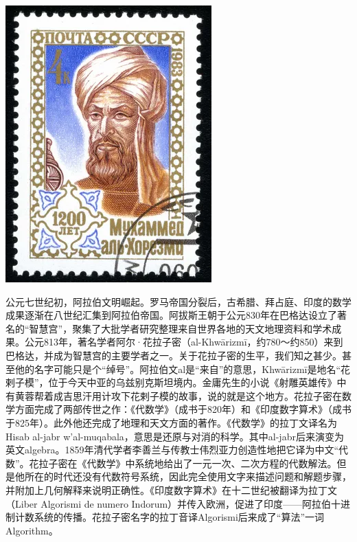 \documentclass[b5paper]{ctexart}
\begin{document}
\begin{mdframed}

\begin{center}
 \includegraphics[scale=0.35]{img/Khwarizmi}
 \label{fig:hindu-arabic-numerals}
\end{center}

公元七世纪初，阿拉伯文明崛起。罗马帝国分裂后，古希腊、拜占庭、印度的数学成果逐渐在八世纪汇集到阿拉伯帝国。阿拔斯王朝于公元830年在巴格达设立了著名的“智慧宫”，聚集了大批学者研究整理来自世界各地的天文地理资料和学术成果。公元813年，著名学者阿尔·花拉子密（al-Khwārizmī，约780～约850）来到巴格达，并成为智慧宫的主要学者之一。关于花拉子密的生平，我们知之甚少。甚至他的名字可能只是个“绰号”。阿拉伯文al是“来自”的意思，Khwārizmī是地名“花剌子模”，位于今天中亚的乌兹别克斯坦境内。金庸先生的小说《射雕英雄传》中有黄蓉帮着成吉思汗用计攻下花剌子模的故事，说的就是这个地方。花拉子密在数学方面完成了两部传世之作：《代数学》（成书于820年）和《印度数字算术》（成书于825年）。此外他还完成了地理和天文方面的著作。《代数学》的拉丁文译名为Hisab al-jabr w'al-muqabala，意思是还原与对消的科学。其中al-jabr后来演变为英文algebra。1859年清代学者李善兰与传教士伟烈亚力创造性地把它译为中文“代数”\cite{HanXueTao2009}。花拉子密在《代数学》中系统地给出了一元一次、二次方程的代数解法。但是他所在的时代还没有代数符号系统，因此完全使用文字来描述问题和解题步骤，并附加上几何解释来说明正确性。《印度数字算术》在十二世纪被翻译为拉丁文（Liber Algorismi de numero Indorum）并传入欧洲，促进了印度——阿拉伯十进制计数系统的传播。花拉子密名字的拉丁音译Algorismi后来成了“算法”一词Algorithm\cite{Britannica-25}。

\end{mdframed}
\end{document}
